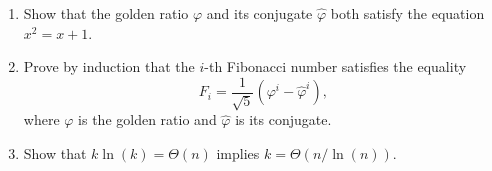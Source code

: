 \documentclass[Chapter03]{subfiles}
\begin{document}
\begin{enumerate}
		\item Show that the golden ratio $\varphi$ and its conjugate $\hat\varphi$ both satisfy the equation $x^2 = x + 1$.
		\begin{answer}
			
		\end{answer}

		\item Prove by induction that the $i$-th Fibonacci number satisfies the equality
		\[
			F_i = \frac{1}{\sqrt{5}}(\varphi^i - \hat\varphi^i),
		\]
		where $\varphi$ is the golden ratio and $\hat\varphi$ is its conjugate.
		\begin{answer}
			
		\end{answer}

		\item Show that $k\ln(k) = \Theta(n)$ implies $k = \Theta(n / \ln(n))$.
		\begin{answer}
			
		\end{answer}

	\end{enumerate}
\end{document}
